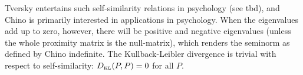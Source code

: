 \documentclass[11pt]{article}
\begin{document}
Tversky entertains such self-similarity relations in psychology (see
tbd), and Chino is primarily interested in applications in psychology.
When the eigenvalues add up to zero, however, there will be positive
and negative eigenvalues (unless the whole proximity matrix is the
null-matrix), which renders the seminorm as defined by Chino
indefinite. The Kullback-Leibler divergence is trivial with respect to
self-similarity: $D_{\mbox{\tiny KL}}(P,P)=0$ for all $P$.


 

\end{document}

